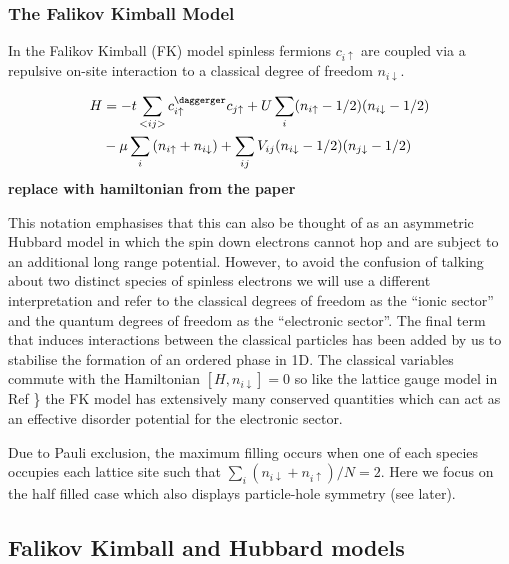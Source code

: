 \hypertarget{the-falikov-kimball-model}{%
\subsubsection{The Falikov Kimball
Model}\label{the-falikov-kimball-model}}

In the Falikov Kimball (FK) model spinless fermions \(c_{i\uparrow}\)
are coupled via a repulsive on-site interaction to a classical degree of
freedom \(n_{i\downarrow}\).

\[\begin{aligned}
H &= -t \sum_{<ij>} c^\daggerger_{i\uparrow}c_{j\uparrow} + U \sum_{i} (n_{i \uparrow} - 1/2)( n_{i\downarrow} - 1/2) \\
       & - \mu \sum_i \left( n_{i \uparrow} + n_{i \downarrow} \right) + \sum_{ij} V_{ij} (n_{i\downarrow} - 1/2)(n_{j\downarrow} - 1/2) 
\end{aligned}\] \textbf{replace with hamiltonian from the paper}

This notation emphasises that this can also be thought of as an
asymmetric Hubbard model in which the spin down electrons cannot hop and
are subject to an additional long range potential. However, to avoid the
confusion of talking about two distinct species of spinless electrons we
will use a different interpretation and refer to the classical degrees
of freedom as the ``ionic sector'' and the quantum degrees of freedom as
the ``electronic sector''. The final term that induces interactions
between the classical particles has been added by us to stabilise the
formation of an ordered phase in 1D. The classical variables commute
with the Hamiltonian \([H, n_{i\downarrow}] = 0\) so like the lattice
gauge model in Ref \textcite{smith_disorder-free_2017}\} the FK model
has extensively many conserved quantities which can act as an effective
disorder potential for the electronic sector.

Due to Pauli exclusion, the maximum filling occurs when one of each
species occupies each lattice site such that
\(\sum_i (n_{i\downarrow} + n_{i\uparrow} )/ N = 2\). Here we focus on
the half filled case which also displays particle-hole symmetry (see
later).

\hypertarget{falikov-kimball-and-hubbard-models}{%
\subsection{Falikov Kimball and Hubbard
models}\label{falikov-kimball-and-hubbard-models}}

